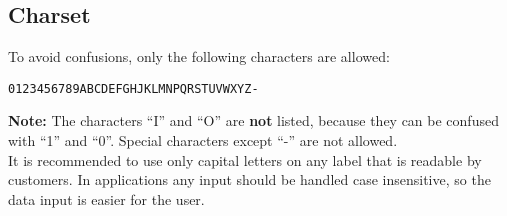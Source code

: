 %
%
%
%
%
%
%

\subsection{Charset}

To avoid confusions, only the following characters are allowed:

\begin{verbatim}
0123456789ABCDEFGHJKLMNPQRSTUVWXYZ-
\end{verbatim}

\textbf{Note:} The characters ``I'' and ``O'' are \textbf{not} listed, because
they can be confused with ``1'' and ``0''. Special characters except ``-'' are
not allowed. \\


It is recommended to use only capital letters on any label that is readable by
customers. In applications any input should be handled case insensitive, so the
data input is easier for the user.
